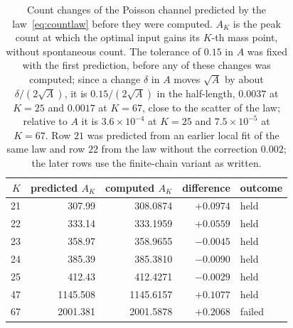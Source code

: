 \documentclass[10pt,letterpaper]{article}
\begin{document}
\begin{table}[tp]
\caption{Count changes of the Poisson channel predicted by the law~\eqref{eq:countlaw} before they were computed. $A_K$ is
the peak count at which the optimal input gains its $K$-th mass point, without spontaneous count. The tolerance of $0.15$ in $A$ was fixed with the first prediction, before
any of these changes was computed; since a change $\delta$ in $A$ moves $\sqrt A$ by about $\delta/(2\sqrt A)$, it is $0.15/(2\sqrt A)$
in the half-length, $0.0037$ at $K=25$ and $0.0017$ at $K=67$, close to the scatter of the law; relative to $A$ it is $3.6\times10^{-4}$
at $K=25$ and $7.5\times10^{-5}$ at $K=67$. Row $21$ was predicted from an earlier local fit of the same law and row $22$ from the law without the correction
$0.002$; the later rows use the finite-chain variant as written.}\label{tab:countlaw}
\centering\small
\begin{tabular}{rrrrl}
\hline
$K$ & predicted $A_K$ & computed $A_K$ & difference & outcome\\
\hline
21 & 307.99 & 308.0874 & $+0.0974$ & held\\
22 & 333.14 & 333.1959 & $+0.0559$ & held\\
23 & 358.97 & 358.9655 & $-0.0045$ & held\\
24 & 385.39 & 385.3810 & $-0.0090$ & held\\
25 & 412.43 & 412.4271 & $-0.0029$ & held\\
47 & 1145.508 & 1145.6157 & $+0.1077$ & held\\
67 & 2001.381 & 2001.5878 & $+0.2068$ & failed\\
\hline
\end{tabular}
\end{table}
\end{document}
